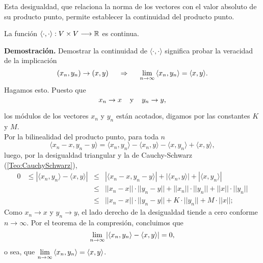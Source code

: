 Esta desigualdad, que relaciona la norma de los
vectores con el valor
absoluto de su producto punto, permite
establecer la continuidad del producto punto. \\


\begin{prop} \label{prop: continuidad del producto punto}
La función $\langle  \cdot , \cdot \rangle :
V \times V \longrightarrow \mathbb{R} $ es continua.
\end{prop}
\noindent
\textbf{Demostración.}
Demostrar la continuidad de 
$\langle  \cdot , \cdot \rangle$ significa 
probar la veracidad de la implicación
\[
(x_{n}, y_{n}) \rightarrow (x,y) \hspace{0.5cm}
\Rightarrow \hspace{0.5cm} \lim\limits_{n \rightarrow \infty}{
\langle  x_{n} , y_{n} \rangle} = \langle  x , y \rangle .
\]
Hagamos esto. Puesto que
\[
x_{n} \rightarrow x \hspace{0.4cm} \text{y}
\hspace{0.4cm} y_{n} \rightarrow y, 
\]

\noindent
los módulos de los vectores $x_{n}$ y $y_{n}$ 
están acotados, digamos por las constantes $K$ y $M$. \\
Por la bilinealidad del producto punto, para toda $n$
\[
\langle x_{n}-x , y_{n}-y \rangle =
\langle x_{n}, y_{n}\rangle -
\langle x_{n} , y \rangle -
\langle x , y_{n} \rangle +
\langle x , y \rangle ,
\]
\noindent
luego, por la desigualdad triangular y la de Cauchy-Schwarz
(\ref{Teo:CauchySchwarz}),
\begin{align*}
0 & \leq |\langle x_{n}, y_{n}\rangle - \langle x , y \rangle|
& \leq & |\langle x_{n}-x , y_{n}-y \rangle| +
|\langle x_{n} , y \rangle| + |\langle x , y_{n} \rangle| \\
&& \leq & ||x_{n}-x|| \cdot ||y_{n}-y|| + ||x_{n}||\cdot ||y_{n}||
+||x|| \cdot ||y_{n}|| \\
&& \leq & ||x_{n}-x|| \cdot ||y_{n}-y|| + K\cdot ||y_{n}||
+M \cdot ||x||; 
\end{align*}
Como $x_{n} \rightarrow x$ y $y_{n} \rightarrow y$,
el lado derecho de la desigualdad tiende a cero
conforme $n \rightarrow \infty$. Por el teorema de la compresión,
concluimos que
\[
\lim\limits_{n \rightarrow \infty}{|\langle x_{n}, y_{n}\rangle - \langle x , y \rangle|}=0,
\]
o sea, que 
$ \lim\limits_{n \rightarrow \infty}{
\langle  x_{n} , y_{n} \rangle} = \langle  x , y \rangle$.
\QEDB
\vspace{0.2cm}



